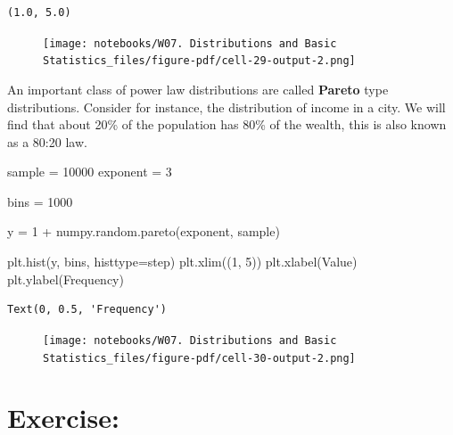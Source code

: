 \documentclass[
  letterpaper,
  DIV=11,
  numbers=noendperiod]{scrreprt}
\newenvironment{Shaded}{\begin{snugshade}}{\end{snugshade}}
\newcommand{\DecValTok}[1]{\textcolor[rgb]{0.68,0.00,0.00}{#1}}
\newcommand{\NormalTok}[1]{\textcolor[rgb]{0.00,0.23,0.31}{#1}}
\newcommand{\OperatorTok}[1]{\textcolor[rgb]{0.37,0.37,0.37}{#1}}
\newcommand{\StringTok}[1]{\textcolor[rgb]{0.13,0.47,0.30}{#1}}
\begin{document}
\begin{verbatim}
(1.0, 5.0)
\end{verbatim}

\begin{figure}[H]

{\centering \texttt{[image: notebooks/W07. Distributions and Basic Statistics\_files/figure-pdf/cell-29-output-2.png]}

}

\end{figure}

An important class of power law distributions are called \textbf{Pareto}
type distributions. Consider for instance, the distribution of income in
a city. We will find that about 20\% of the population has 80\% of the
wealth, this is also known as a 80:20 law.

\begin{Shaded}
\begin{Highlighting}[]
\NormalTok{sample }\OperatorTok{=} \DecValTok{10000}
\NormalTok{exponent }\OperatorTok{=} \DecValTok{3}

\NormalTok{bins }\OperatorTok{=} \DecValTok{1000}


\NormalTok{y }\OperatorTok{=} \DecValTok{1} \OperatorTok{+}\NormalTok{ numpy.random.pareto(exponent, sample)}

\NormalTok{plt.hist(y, bins, histtype}\OperatorTok{=}\StringTok{\textquotesingle{}step\textquotesingle{}}\NormalTok{)}
\NormalTok{plt.xlim((}\DecValTok{1}\NormalTok{, }\DecValTok{5}\NormalTok{))}
\NormalTok{plt.xlabel(}\StringTok{\textquotesingle{}Value\textquotesingle{}}\NormalTok{)}
\NormalTok{plt.ylabel(}\StringTok{\textquotesingle{}Frequency\textquotesingle{}}\NormalTok{)}
\end{Highlighting}
\end{Shaded}

\begin{verbatim}
Text(0, 0.5, 'Frequency')
\end{verbatim}

\begin{figure}[H]

{\centering \texttt{[image: notebooks/W07. Distributions and Basic Statistics\_files/figure-pdf/cell-30-output-2.png]}

}

\end{figure}

\hypertarget{exercise-19}{%
\section{Exercise:}\label{exercise-19}}
\end{document}
